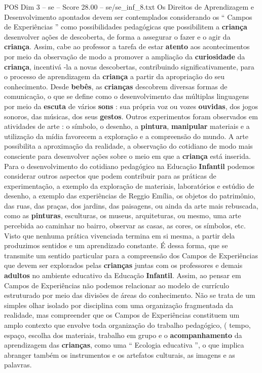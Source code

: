 \begin{textsample}{POS Dim 3 – se – Score 28.00 – se/se\_inf\_8.txt}
Os Direitos de Aprendizagem e Desenvolvimento apontados devem ser contemplados considerando os “ Campos de Experiências ” como possibilidades pedagógicas que possibilitem a \textbf{criança} desenvolver ações de descoberta, de forma a assegurar o fazer e o agir da \textbf{criança}.
Assim, cabe ao professor a tarefa de estar \textbf{atento} aos acontecimentos por meio da observação de modo a promover a ampliação da \textbf{curiosidade} da \textbf{criança}, incentivá -la a novas descobertas, contribuindo significativamente, para o processo de aprendizagem da \textbf{criança} a partir da apropriação do seu conhecimento.
Desde \textbf{bebês}, as \textbf{crianças} descobrem diversas formas de comunicação, o que se define como o desenvolvimento das múltiplas linguagens por meio da \textbf{escuta} de vários \textbf{sons} : sua própria voz ou vozes \textbf{ouvidas}, dos jogos sonoros, das músicas, dos seus \textbf{gestos}.
Outros experimentos foram observados em atividades de arte : o símbolo, o desenho, a \textbf{pintura}, \textbf{manipular} materiais e a utilização da mídia favorecem a exploração e a compreensão do mundo.
A arte possibilita a aproximação da realidade, a observação do cotidiano de modo mais consciente para desenvolver ações sobre o meio em que a \textbf{criança} está inserida.
Para o desenvolvimento do cotidiano pedagógico na Educação \textbf{Infantil} podemos considerar outros aspectos que podem contribuir para as práticas de experimentação, a exemplo da exploração de materiais, laboratórios e estúdio de desenho, a exemplo das experiências de Reggio Emília, os objetos do patrimônio, das ruas, das praças, dos jardins, das paisagens, ou ainda da arte mais rebuscada, como as \textbf{pinturas}, esculturas, os museus, arquiteturas, ou mesmo, uma arte percebida ao caminhar no bairro, observar as casas, as cores, os símbolos, etc.
Visto que nenhuma prática vivenciada termina em si mesma, a partir dela produzimos sentidos e um aprendizado constante.
É dessa forma, que se transmite um sentido particular para a compreensão dos Campos de Experiências que devem ser explorados pelas \textbf{crianças} juntas com os professores e demais \textbf{adultos} no ambiente educativo da Educação \textbf{Infantil}.
Assim, ao pensar em Campos de Experiências não podemos relacionar ao modelo de currículo estruturado por meio das divisões de áreas do conhecimento.
Não se trata de um simples olhar isolado por disciplina com uma organização fragmentada da realidade, mas compreender que os Campos de Experiências constituem um amplo contexto que envolve toda organização do trabalho pedagógico, ( tempo, espaço, escolha dos materiais, trabalho em grupo e o \textbf{acompanhamento} da aprendizagem das \textbf{crianças}, como uma “ Ecologia educativa ”, o que implica abranger também os instrumentos e os artefatos culturais, as imagens e as palavras.

\end{textsample}
